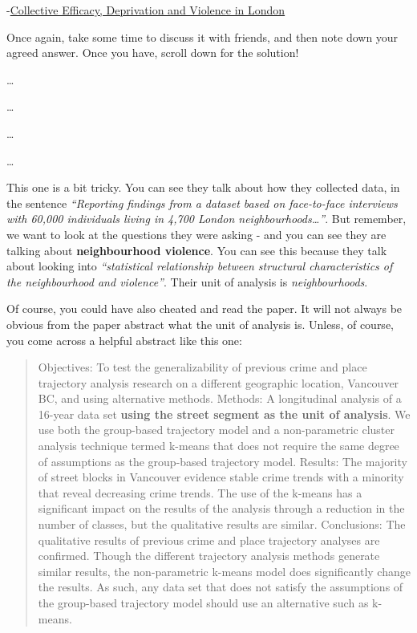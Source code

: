 \documentclass[
]{book}
\begin{document}
-\href{https://academic.oup.com/bjc/article-abstract/53/6/1050/418215}{Collective Efficacy, Deprivation and Violence in London}

Once again, take some time to discuss it with friends, and then note down your agreed answer. Once you have, scroll down for the solution!

\ldots{}

\ldots{}

\ldots{}

\ldots{}

This one is a bit tricky. You can see they talk about how they collected data, in the sentence \emph{``Reporting findings from a dataset based on face-to-face interviews with 60,000 individuals living in 4,700 London neighbourhoods\ldots{}''}. But remember, we want to look at the questions they were asking - and you can see they are talking about \textbf{neighbourhood violence}. You can see this because they talk about looking into \emph{``statistical relationship between structural characteristics of the neighbourhood and violence''}. Their unit of analysis is \emph{neighbourhoods}.

Of course, you could have also cheated and read the paper. It will not always be obvious from the paper abstract what the unit of analysis is. Unless, of course, you come across a helpful abstract like this one:

\begin{quote}
Objectives: To test the generalizability of previous crime and place trajectory analysis research on a different geographic location, Vancouver BC, and using alternative methods.
Methods: A longitudinal analysis of a 16-year data set \textbf{using the street segment as the unit of analysis}. We use both the group-based trajectory model and a non-parametric cluster analysis technique termed k-means that does not require the same degree of assumptions as the group-based trajectory model.
Results: The majority of street blocks in Vancouver evidence stable crime trends with a minority that reveal decreasing crime trends. The use of the k-means has a significant impact on the results of the analysis through a reduction in the number of classes, but the qualitative results are similar.
Conclusions: The qualitative results of previous crime and place trajectory analyses are confirmed. Though the different trajectory analysis methods generate similar results, the non-parametric k-means model does significantly change the results. As such, any data set that does not satisfy the assumptions of the group-based trajectory model should use an alternative such as k-means.
\end{quote}
\end{document}
